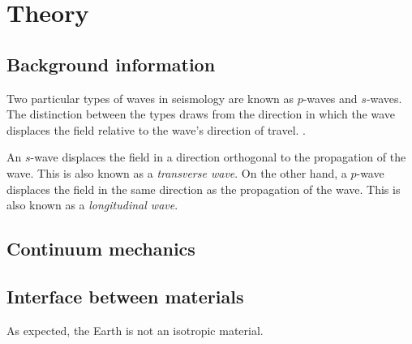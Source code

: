 \chapter{Theory}
\section{Background information}

Two particular types of waves in seismology are known as $p$-waves and $s$-waves. The distinction between the types draws from the direction in which the wave displaces the field relative to the wave's direction of travel. \cite[57]{stein2009introduction}.

An $s$-wave displaces the field in a direction orthogonal to the propagation of the wave. This is also known as a \textit{transverse wave}.
On the other hand, a $p$-wave displaces the field in the same direction as the propagation of the wave. This is also known as a \textit{longitudinal wave}\cite[57]{stein2009introduction}.





\section{Continuum mechanics}

\section{Interface between materials}
As expected, the Earth is not an isotropic material.
